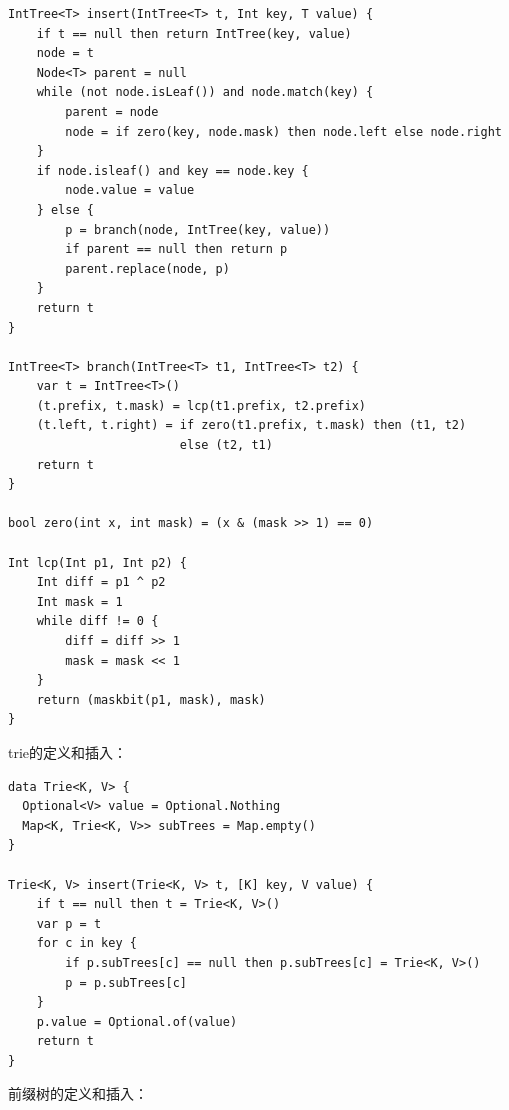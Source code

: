 \documentclass[b5paper]{ctexart}
\begin{document}
\begin{lstlisting}[language = Bourbaki]
IntTree<T> insert(IntTree<T> t, Int key, T value) {
    if t == null then return IntTree(key, value)
    node = t
    Node<T> parent = null
    while (not node.isLeaf()) and node.match(key) {
        parent = node
        node = if zero(key, node.mask) then node.left else node.right
    }
    if node.isleaf() and key == node.key {
        node.value = value
    } else {
        p = branch(node, IntTree(key, value))
        if parent == null then return p
        parent.replace(node, p)
    }
    return t
}

IntTree<T> branch(IntTree<T> t1, IntTree<T> t2) {
    var t = IntTree<T>()
    (t.prefix, t.mask) = lcp(t1.prefix, t2.prefix)
    (t.left, t.right) = if zero(t1.prefix, t.mask) then (t1, t2)
                        else (t2, t1)
    return t
}

bool zero(int x, int mask) = (x & (mask >> 1) == 0)

Int lcp(Int p1, Int p2) {
    Int diff = p1 ^ p2
    Int mask = 1
    while diff != 0 {
        diff = diff >> 1
        mask = mask << 1
    }
    return (maskbit(p1, mask), mask)
}
\end{lstlisting}


trie的定义和插入：

\begin{lstlisting}[language = Bourbaki]
data Trie<K, V> {
  Optional<V> value = Optional.Nothing
  Map<K, Trie<K, V>> subTrees = Map.empty()
}

Trie<K, V> insert(Trie<K, V> t, [K] key, V value) {
    if t == null then t = Trie<K, V>()
    var p = t
    for c in key {
        if p.subTrees[c] == null then p.subTrees[c] = Trie<K, V>()
        p = p.subTrees[c]
    }
    p.value = Optional.of(value)
    return t
}
\end{lstlisting}

前缀树的定义和插入：
\end{document}
